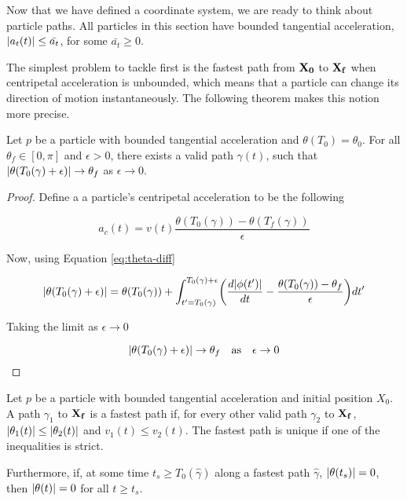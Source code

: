 Now that we have defined a coordinate system, we are ready to think about particle paths. All particles in this section have bounded tangential acceleration, $\abs{a_t(t)} \le \bar{a_t}$, for some $\bar{a_t} \ge 0$.

The simplest problem to tackle first is the fastest path from $\mathbf{X_0}$ to $\mathbf{X_f}$ when centripetal acceleration is unbounded, which means that a particle can change its direction of motion instantaneously. The following theorem makes this notion more precise.

\begin{theorem}\label{thm:theta-choose}
  Let $p$ be a particle with bounded tangential acceleration and $\theta(T_0) = \theta_0$. For all $\theta_f \in [0, \pi]$ and $\epsilon > 0$, there exists a valid path $\gamma(t)$, such that $\abs{\theta(T_0(\gamma) + \epsilon)} \to \theta_f$ as $\epsilon \to 0$.
\end{theorem}
  
\begin{proof}
  Define a a particle's centripetal acceleration to be the following

  \[
      a_c(t) = v(t) \frac{\theta(T_0(\gamma)) - \theta(T_f(\gamma))}{\epsilon}
  \]

  Now, using Equation \ref{eq:theta-diff}

  \[
    \abs{\theta(T_0(\gamma) + \epsilon)} = \theta(T_0(\gamma)) + \int_{t'=T_0(\gamma)}^{T_0(\gamma)+\epsilon} \paren{\frac{d\abs{\phi(t')}}{dt} - \frac{\theta(T_0(\gamma)) - \theta_f}{\epsilon}} dt'
  \]

  Taking the limit as $\epsilon \to 0$

  \[
    \abs{\theta(T_0(\gamma) + \epsilon)} \to \theta_f \quad \text{as} \quad \epsilon \to 0
  \]
\end{proof}

\begin{theorem}\label{thm:theta-min}
  Let $p$ be a particle with bounded tangential acceleration and initial position $X_0$. A path $\gamma_1$ to $\mathbf{X_f}$ is a fastest path if, for every other valid path $\gamma_2$ to $\mathbf{X_f}$, $\abs{\theta_1(t)} \le \abs{\theta_2(t)}$ and $v_1(t) \le v_2(t)$. The fastest path is unique if one of the inequalities is strict.

  Furthermore, if, at some time $t_s \ge T_0(\hat{\gamma})$ along a fastest path $\hat{\gamma}$, $\abs{\theta(t_s)} = 0$, then $\abs{\theta(t)} = 0$ for all $t \ge t_s$. 
\end{theorem}

